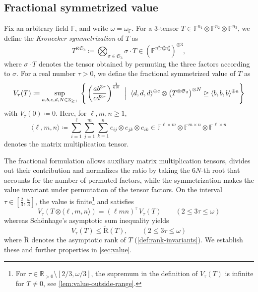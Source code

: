 \documentclass[11pt,letterpaper]{article}
\numberwithin{equation}{section}
\newcommand{\RR}{\mathbb{R}}
\newcommand{\ark}{\widetilde{\mathrm{R}}}
\newcommand{\FF}{\mathbb{F}}
\begin{document}
\subsection{Fractional symmetrized value}
Fix an arbitrary field $\FF$, and write $\omega=\omega_\FF$.
For a $3$-tensor $T\in\FF^{n_1}\otimes\FF^{n_2}\otimes\FF^{n_3}$, we define the \emph{Kronecker symmetrization} of $T$ as \[
T^{\otimes\mathfrak{S}_3} \coloneqq \bigotimes_{\sigma\in\mathfrak{S}_3} \sigma\cdot T \in \left(\FF^{n_1^2 n_2^2 n_3^2}\right)^{\otimes 3},
\]
where $\sigma\cdot T$ denotes the tensor obtained by permuting the three factors according to $\sigma$.
For a real number $\tau > 0$, we define the fractional symmetrized value of $T$ as
\[
V_\tau(T) \coloneqq \sup_{a,b,c,d,N\in \mathbb{Z}_{\geq 1}} \; \left\{\, \left(\frac{ab^{3\tau}}{cd^{3\tau}}\right)^{\frac{1}{6N}}\; \Bigm|\; \langle d,d,d\rangle^{\oplus c}\otimes\left( T^{\otimes\mathfrak{S}_3}\right)^{\otimes N} \trianglerighteq \langle b,b,b\rangle^{\oplus a} \right\}
\]
with $V_\tau(0)\coloneqq 0$.
Here, for $\ell,m,n\geq 1$, \[
\langle \ell,m,n\rangle \coloneqq \sum_{i=1}^{\ell}\sum_{j=1}^m \sum_{k=1}^n e_{ij}\otimes e_{jk}\otimes e_{ik} \in \FF^{\ell\times m}\otimes \FF^{m\times n}\otimes \FF^{\ell\times n}
\] denotes the matrix multiplication tensor.

The fractional formulation allows auxiliary matrix multiplication tensors, divides out their contribution and normalizes the ratio by taking the $6N$-th root that accounts for the number of permuted factors, while the symmetrization makes the value invariant under permutation of the tensor factors.
On the interval~$\tau \in [\frac23, \frac{\omega}3]$, the value is finite\footnote{For $\tau\in\RR_{>0}\setminus [2/3,\omega/3]$, the supremum in the definition of $V_\tau(T)$ is infinite for $T\neq 0$, see \cref{lem:value-outside-range}.} and satisfies \begin{equation}
    \label{eq:matmul-normalization}
V_\tau(T\otimes \langle \ell,m,n\rangle) = \left(\ell m n\right)^{\tau} \, V_\tau(T)\qquad (2\leq 3\tau\leq \omega)
\end{equation} whereas Sch\"{o}nhage's asymptotic sum inequality yields \begin{equation}
\label{eq:schonhages-ineq}
V_{\tau}(T)\leq \ark(T), \qquad (2\leq 3\tau\leq \omega)
\end{equation} where $\ark$ denotes the asymptotic rank of $T$ (\cref{def:rank-invariants}).
We establish these and further properties in \cref{sec:value}.
\end{document}
